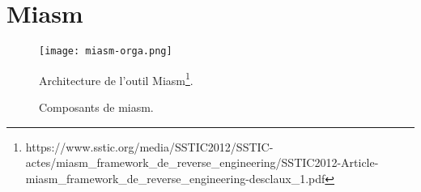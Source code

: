\section{Miasm}
\begin{figure}[h]
    \centering
    \texttt{[image: miasm-orga.png]}
    \caption{Composants de miasm.}
    Architecture de l'outil Miasm\footnote{https://www.sstic.org/media/SSTIC2012/SSTIC-actes/miasm\_framework\_de\_reverse\_engineering/SSTIC2012-Article-miasm\_framework\_de\_reverse\_engineering-desclaux\_1.pdf}.
\end{figure}
